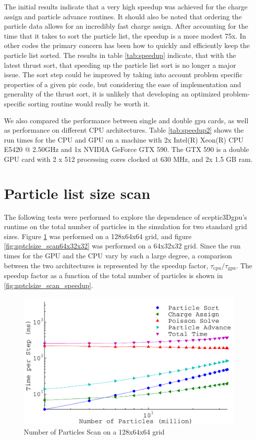 The initial results indicate that a very high speedup was achieved for the charge assign and particle advance routines. It should also be noted that ordering the particle data allows for an incredibly fast charge assign. After accounting for the time that it takes to sort the particle list, the speedup is a more modest 75x. In other codes the primary concern has been how to quickly and efficiently keep the particle list sorted. The results in table \ref{tab:speedup} indicate, that with the latest thrust sort, that speeding up the particle list sort is no longer a major issue. The sort step could be improved by taking into account problem specific properties of a given pic code, but considering the ease of implementation and generality of the thrust sort, it is unlikely that developing an optimized problem-specific sorting routine would really be worth it. 

We also compared the performance between single and double gpu cards, as well as performance on different CPU architectures. Table \ref{tab:speedup2} shows the run times for the CPU and GPU on a machine with 2x  Intel(R) Xeon(R) CPU E5420 @ 2.50GHz and 1x NVIDIA GeForce GTX 590. The GTX 590 is a double GPU card with 2 x 512 processing cores clocked at 630 MHz, and 2x 1.5 GB ram. 

	
	\section{Particle list size scan}
The following tests were performed to explore the dependence of sceptic3Dgpu's runtime on the total number of particles in the simulation for two standard grid sizes. Figure \ref{fig:nptclsize_scan128x64x64} was performed on a 128x64x64 grid, and figure \ref{fig:nptclsize_scan64x32x32} was performed on a 64x32x32 grid. Since the run times for the GPU and the CPU vary by such a large degree, a comparison between the two architectures is represented by the speedup factor, $\tau_{\mathrm{cpu}}/\tau_{\mathrm{gpu}}$. The speedup factor as a function of the total number of particles is shown in \ref{fig:nptclsize_scan_speedup}.

\begin{figure}
\begin{center}
\includegraphics[width=6in]{performance/nptclsize_scan128x64x64ons8bins.pdf}
\end{center}
\caption{Number of Particles Scan on a 128x64x64 grid}
\label{fig:nptclsize_scan128x64x64}
\end{figure}

